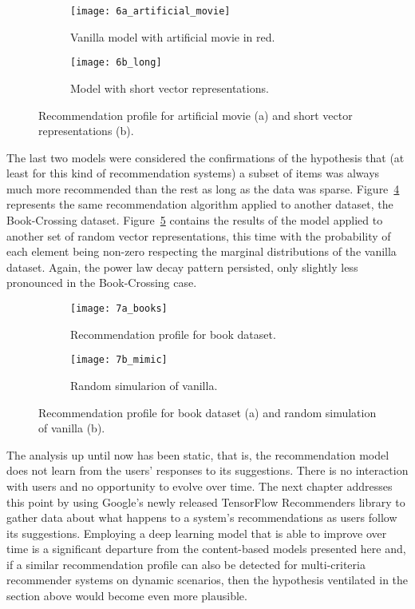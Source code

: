 \begin{figure}
  \centering
  \begin{subfigure}{0.45\textwidth}
    \centering
    \texttt{[image: 6a\_artificial\_movie]}
    \caption{Vanilla model with artificial movie in red.\label{fig:fig6a}}
  \end{subfigure}
  \begin{subfigure}{0.45\textwidth}
    \centering
    \texttt{[image: 6b\_long]}
    \caption{Model with short vector representations.\label{fig:fig6b}}
  \end{subfigure}
  \caption{Recommendation profile for artificial movie (a) and short vector
    representations (b).\label{fig:fig6}}
\end{figure}

The last two models were considered the confirmations of the hypothesis that (at
least for this kind of recommendation systems) a subset of items was always much
more recommended than the rest as long as the data was sparse.
Figure~\ref{fig:fig7a} represents the same recommendation algorithm applied to
another dataset, the Book-Crossing dataset. Figure~\ref{fig:fig7b} contains the
results of the model applied to another set of random vector representations,
this time with the probability of each element being non-zero respecting the
marginal distributions of the vanilla dataset. Again, the power law decay
pattern persisted, only slightly less pronounced in the Book-Crossing case.

\begin{figure}
  \centering
  \begin{subfigure}{0.45\textwidth}
    \centering
    \texttt{[image: 7a\_books]}
    \caption{Recommendation profile for book dataset.\label{fig:fig7a}}
  \end{subfigure}
  \begin{subfigure}{0.45\textwidth}
    \centering
    \texttt{[image: 7b\_mimic]}
    \caption{Random simularion of vanilla.\label{fig:fig7b}}
  \end{subfigure}
  \caption{Recommendation profile for book dataset (a) and random simulation of
    vanilla (b).\label{fig:fig7}}
\end{figure}

The analysis up until now has been static, that is, the recommendation model
does not learn from the users' responses to its suggestions. There is no
interaction with users and no opportunity to evolve over time. The next chapter
addresses this point by using Google's newly released TensorFlow Recommenders
library \citep{noauthor_tensorflow_nodate} to gather data about what happens to
a system's recommendations as users follow its suggestions. Employing a deep
learning model that is able to improve over time is a significant departure from
the content-based models presented here and, if a similar recommendation profile
can also be detected for multi-criteria recommender systems on dynamic
scenarios, then the hypothesis ventilated in the section above would become even
more plausible.
